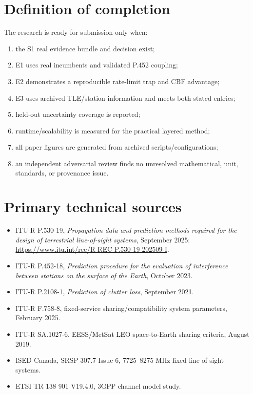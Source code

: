 \documentclass[11pt]{article}
\begin{document}
\section{Definition of completion}

The research is ready for submission only when:

\begin{enumerate}
\item the S1 real evidence bundle and decision exist;
\item E1 uses real incumbents and validated P.452 coupling;
\item E2 demonstrates a reproducible rate-limit trap and CBF advantage;
\item E3 uses archived TLE/station information and meets both stated entries;
\item held-out uncertainty coverage is reported;
\item runtime/scalability is measured for the practical layered method;
\item all paper figures are generated from archived scripts/configurations;
\item an independent adversarial review finds no unresolved mathematical, unit, standards, or provenance issue.
\end{enumerate}

\section*{Primary technical sources}

\begin{itemize}
\item ITU-R P.530-19, \emph{Propagation data and prediction methods required for the design of terrestrial line-of-sight systems}, September 2025: \url{https://www.itu.int/rec/R-REC-P.530-19-202509-I}.
\item ITU-R P.452-18, \emph{Prediction procedure for the evaluation of interference between stations on the surface of the Earth}, October 2023.
\item ITU-R P.2108-1, \emph{Prediction of clutter loss}, September 2021.
\item ITU-R F.758-8, fixed-service sharing/compatibility system parameters, February 2025.
\item ITU-R SA.1027-6, EESS/MetSat LEO space-to-Earth sharing criteria, August 2019.
\item ISED Canada, SRSP-307.7 Issue 6, 7725--8275 MHz fixed line-of-sight systems.
\item ETSI TR 138 901 V19.4.0, 3GPP channel model study.
\end{itemize}
\end{document}
